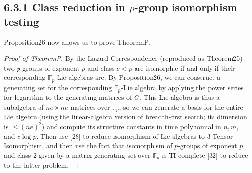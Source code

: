 \documentclass[10pt,a4paper]{article}
\begin{document}
\subsection*{6.3.1 Class reduction in $p$-group isomorphism testing}
Proposition26 now allows us to prove TheoremP.
\begin{proof}[Proof of TheoremP]
By the Lazard Correspondence (reproduced as Theorem25) two $p$-groups of exponent $p$ and class $c<p$ are isomorphic if and only if their corresponding $\mathbb F_p$-Lie algebras are. By Proposition26, we can construct a generating set for the corresponding $\mathbb F_p$-Lie algebra by applying the power series for logarithm to the generating matrices of $G$. This Lie algebra is thus a subalgebra of $ne\times ne$ matrices over $\mathbb F_p$, so we can generate a basis for the entire Lie algebra (using the linear-algebra version of breadth-first search; its dimension is $\le(ne)^2$) and compute its structure constants in time polynomial in $n,m$, and $e\log p$. Then use [28] to reduce isomorphism of Lie algebras to 3-Tensor Isomorphism, and then use the fact that isomorphism of $p$-groups of exponent $p$ and class 2 given by a matrix generating set over $\mathbb F_p$ is TI-complete [32] to reduce to the latter problem.
\end{proof}
\end{document}
